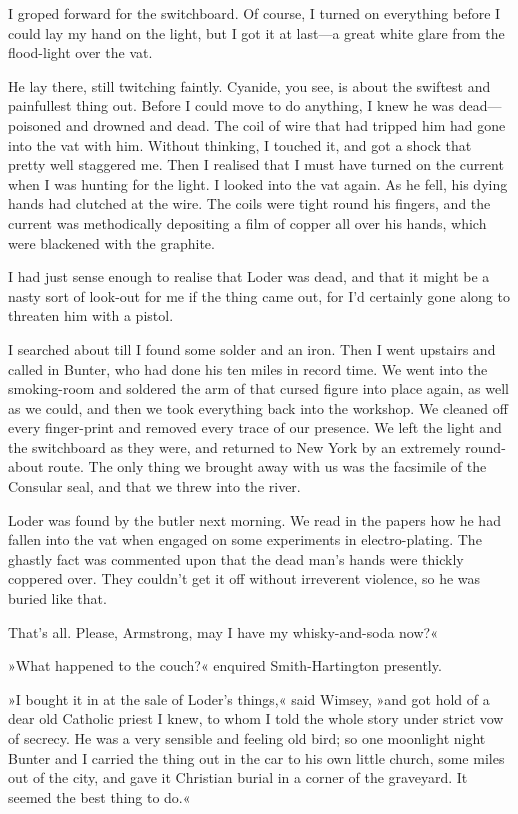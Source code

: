 I groped forward for the switchboard. Of course, I turned on everything before I could lay my hand on the light, but I got it at last—a great white glare from the flood-light over the vat.

He lay there, still twitching faintly. Cyanide, you see, is about the swiftest and painfullest thing out. Before I could move to do anything, I knew he was dead—poisoned and drowned and dead. The coil of wire that had tripped him had gone into the vat with him. Without thinking, I touched it, and got a shock that pretty well staggered me. Then I realised that I must have turned on the current when I was hunting for the light. I looked into the vat again. As he fell, his dying hands had clutched at the wire. The coils were tight round his fingers, and the current was methodically depositing a film of copper all over his hands, which were blackened with the graphite.

I had just sense enough to realise that Loder was dead, and that it might be a nasty sort of look-out for me if the thing came out, for I'd certainly gone along to threaten him with a pistol.

I searched about till I found some solder and an iron. Then I went upstairs and called in Bunter, who had done his ten miles in record time. We went into the smoking-room and soldered the arm of that cursed figure into place again, as well as we could, and then we took everything back into the workshop. We cleaned off every finger-print and removed every trace of our presence. We left the light and the switchboard as they were, and returned to New York by an extremely round-about route. The only thing we brought away with us was the facsimile of the Consular seal, and that we threw into the river.

Loder was found by the butler next morning. We read in the papers how he had fallen into the vat when engaged on some experiments in electro-plating. The ghastly fact was commented upon that the dead man's hands were thickly coppered over. They couldn't get it off without irreverent violence, so he was buried like that.

That's all. Please, Armstrong, may I have my whisky-and-soda now?«

»What happened to the couch?« enquired Smith-Hartington presently.

»I bought it in at the sale of Loder's things,« said Wimsey, »and got hold of a dear old Catholic priest I knew, to whom I told the whole story under strict vow of secrecy. He was a very sensible and feeling old bird; so one moonlight night Bunter and I carried the thing out in the car to his own little church, some miles out of the city, and gave it Christian burial in a corner of the graveyard. It seemed the best thing to do.«